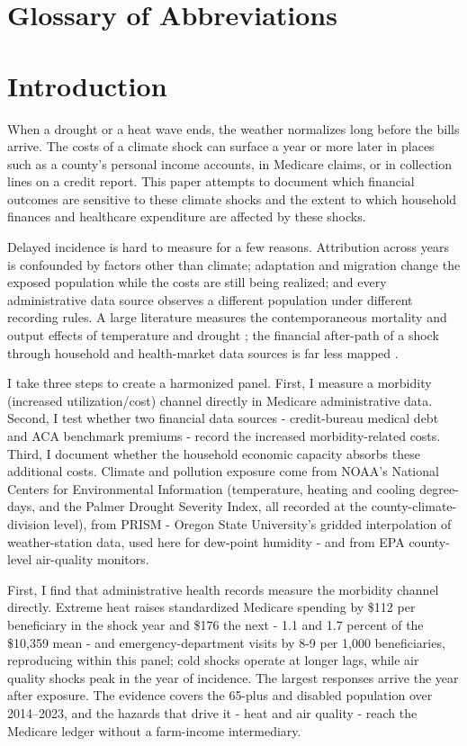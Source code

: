 \documentclass[a4paper,11pt]{article}
\begin{document}
\section*{Glossary of Abbreviations}

\clearpage
\FloatBarrier
\section{Introduction}

When a drought or a heat wave ends, the weather normalizes long before the bills arrive. The costs of a climate shock can surface a year or more later in places such as a county's personal income accounts, in Medicare claims, or in collection lines on a credit report. This paper attempts to document which financial outcomes are sensitive to these climate shocks and the extent to which household finances and healthcare expenditure are affected by these shocks.

Delayed incidence is hard to measure for a few reasons. Attribution across years is confounded by factors other than climate; adaptation and migration change the exposed population while the costs are still being realized; and every administrative data source observes a different population under different recording rules. A large literature measures the contemporaneous mortality and output effects of temperature and drought \citep{deschenes2007agricultural,dell2014weather,hsiang2016econometrics}; the financial after-path of a shock through household and health-market data sources is far less mapped \citep{dobkin2018hospital,kluender2021debt}.

I take three steps to create a harmonized panel. First, I measure a morbidity (increased utilization/cost) channel directly in Medicare administrative data. Second, I test whether two financial data sources - credit-bureau medical debt and ACA benchmark premiums - record the increased morbidity-related costs. Third, I document whether the household economic capacity absorbs these additional costs. Climate and pollution exposure come from NOAA's National Centers for Environmental Information (temperature, heating and cooling degree-days, and the Palmer Drought Severity Index, all recorded at the county-climate-division level), from PRISM - Oregon State University's gridded interpolation of weather-station data, used here for dew-point humidity - and from EPA county-level air-quality monitors.

First, I find that administrative health records measure the morbidity channel directly. Extreme heat raises standardized Medicare spending by \$112 per beneficiary in the shock year and \$176 the next - 1.1 and 1.7 percent of the \$10,359 mean - and emergency-department visits by 8-9 per 1,000 beneficiaries, reproducing \citet{deryugina2019mortality} within this panel; cold shocks operate at longer lags, while air quality shocks peak in the year of incidence. The largest responses arrive the year after exposure. The evidence covers the 65-plus and disabled population over 2014--2023, and the hazards that drive it - heat and air quality - reach the Medicare ledger without a farm-income intermediary.
\end{document}
